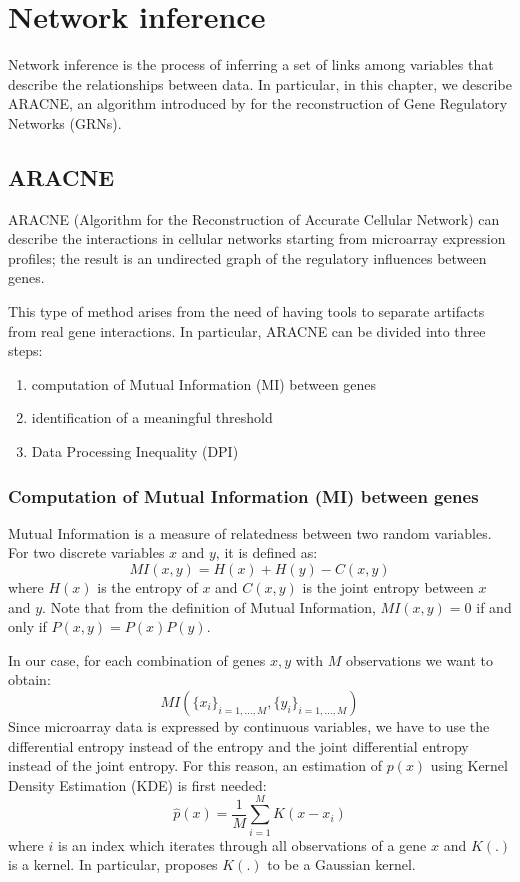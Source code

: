 \chapter{Network inference}

Network inference is the process of inferring a set of links among variables
that describe the relationships between data.
In particular, in this chapter, we describe ARACNE, an algorithm introduced by \cite{DBLP:journals/bmcbi/MargolinNBWSFC06}
for the reconstruction of Gene Regulatory Networks (GRNs).

\section{ARACNE} \label{aracne}
ARACNE (Algorithm for the Reconstruction of Accurate Cellular Network)
can describe the interactions in cellular networks
starting from microarray expression profiles;
the result is an undirected graph of the regulatory influences between genes.

This type of method arises from the need of having tools to separate artifacts
from real gene interactions.
In particular, ARACNE can be divided into three steps:
\begin{enumerate}
    \item computation of Mutual Information (MI) between genes
    \item identification of a meaningful threshold
    \item Data Processing Inequality (DPI)
\end{enumerate}

\subsection{Computation of Mutual Information (MI) between genes} \label{MI}
Mutual Information is a measure of relatedness between two random variables.
For two discrete variables $x$ and $y$, it is defined as:
\[ \mathit{MI}(x, y) = H(x) + H(y) - C(x, y) \]
where $H(x)$ is the entropy of $x$ and $C(x, y)$ is the joint entropy between $x$ and $y$.
Note that from the definition of Mutual Information,
$\mathit{MI}(x, y) = 0$
if and only if $P(x, y) = P(x) P(y)$.

In our case, for each combination of genes $x, y$ with $M$ observations we want to obtain:
\[ \mathit{MI}(\{ x_i \}_{i=1,\dots,M}, \{ y_i \}_{i=1,\dots,M}) \]
Since microarray data is expressed by continuous variables,
we have to use the differential entropy instead of the entropy
and the joint differential entropy instead of the joint entropy.
For this reason, an estimation of $p(x)$
using Kernel Density Estimation (KDE) is first needed:
\[ \hat{p}(x) = \frac{1}{M} \sum_{i=1}^{M} K(x - x_i) \]
where $i$ is an index which iterates through all observations of a gene $x$
and $K(.)$ is a kernel.
In particular, \cite{DBLP:journals/bmcbi/MargolinNBWSFC06} proposes
$K(.)$ to be a Gaussian kernel.

